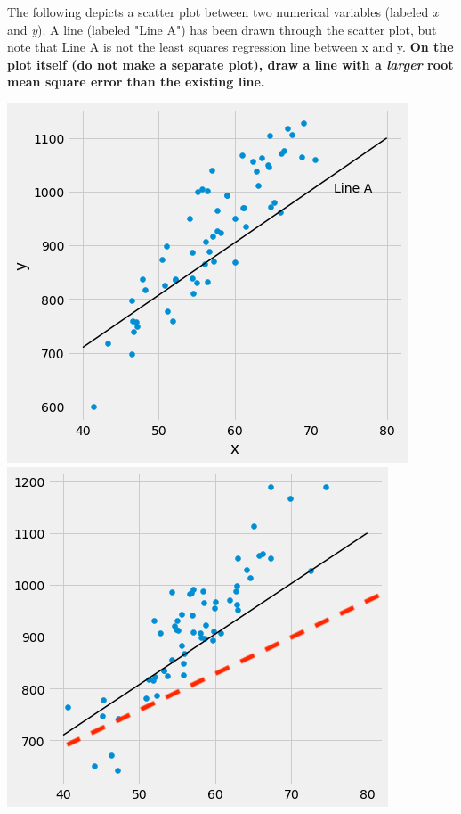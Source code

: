 \begin{enumerate}
    \vskip 0.2in
     The following depicts a scatter plot between two numerical variables (labeled \textit{x} and \textit{y}). A line (labeled "Line A") has been drawn through the scatter plot, but note that Line A is not the least squares regression line between x and y. \textbf{On the plot itself (do not make a separate plot), draw a line with a \textit{larger} root mean square error than the existing line.}
    \vskip 0.2in
    \begin{center}
        \solutionimage
        {
        \includegraphics[scale=.45]{figures/labelledporpourri.png}
        }
        {
        \includegraphics[scale=.45]{figures/potpourri_plot_sol.png}
        }
    \end{center}
    

\end{enumerate}
